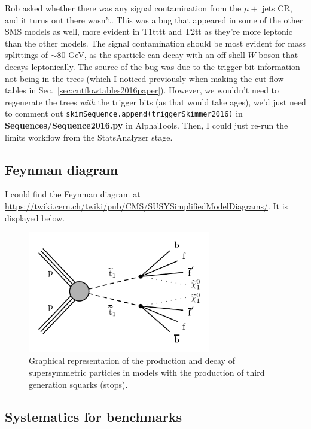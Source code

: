 
Rob asked whether there was any signal contamination from the $\mu +$ jets CR, and it turns out there wasn't. This was a bug that appeared in some of the other SMS models as well, more evident in T1tttt and T2tt as they're more leptonic than the other models. The signal contamination should be most evident for mass splittings of $\sim 80$ GeV, as the sparticle can decay with an off-shell $W$ boson that decays leptonically. The source of the bug was due to the trigger bit information not being in the trees (which I noticed previously when making the cut flow tables in Sec.~\ref{sec:cutflowtables2016paper}). However, we wouldn't need to regenerate the trees \emph{with} the trigger bits (as that would take ages), we'd just need to comment out \texttt{skimSequence.append(triggerSkimmer2016)} in \textbf{Sequences/Sequence2016.py} in AlphaTools. Then, I could just re-run the limits workflow from the StatsAnalyzer stage.


\subsection{Feynman diagram}

I could find the Feynman diagram at \url{https://twiki.cern.ch/twiki/pub/CMS/SUSYSimplifiedModelDiagrams/}. It is displayed below.

\begin{figure}[H]
\centering
\includegraphics[width=80mm]{./sec31/T2tt-4bd_Feynman_diagram.pdf}
\caption{Graphical representation of the production and decay of supersymmetric particles in models with the production of third generation squarks (stops).}
\end{figure}


\subsection{Systematics for benchmarks}

